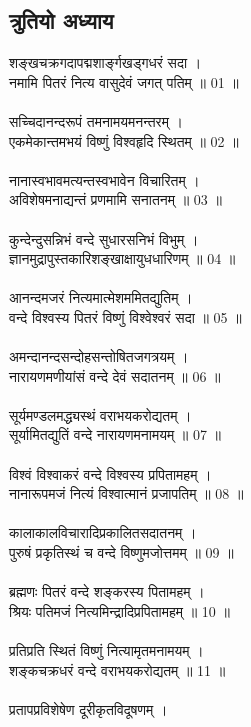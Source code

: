 \subsection{\sanskrit त्रुतियो अध्याय}
\sanskrit
शङ्खचक्रगदापद्मशार्ङ्गखड्गधरं सदा ।\\
नमामि पितरं नित्य वासुदेवं जगत् पतिम् ॥ 01 ॥\\
\\
सच्चिदानन्दरूपं तमनामयमनन्तरम् ।\\
एकमेकान्तमभयं विष्णुं विश्वहृदि स्थितम् ॥ 02 ॥\\
\\
नानास्वभावमत्यन्तस्वभावेन विचारितम् ।\\
अविशेषमनाद्यन्तं प्रणमामि सनातनम् ॥ 03 ॥\\
\\
कुन्देन्दुसन्निभं वन्दे सुधारसनिभं विभुम् ।\\
ज्ञानमुद्रापुस्तकारिशङ्खाक्षायुधधारिणम् ॥ 04 ॥\\
\\
आनन्दमजरं नित्यमात्मेशममितद्युतिम् ।\\
वन्दे विश्वस्य पितरं विष्णुं विश्वेश्वरं सदा ॥ 05 ॥\\
\\
अमन्दानन्दसन्दोहसन्तोषितजगत्रयम् ।\\
नारायणमणीयांसं वन्दे देवं सदातनम् ॥ 06 ॥\\
\\
सूर्यमण्डलमद्ध्यस्थं वराभयकरोद्यतम् ।\\
सूर्यामितद्युतिं वन्दे नारायणमनामयम् ॥ 07 ॥\\
\\
विश्वं विश्वाकरं वन्दे विश्वस्य प्रपितामहम् ।\\
नानारूपमजं नित्यं विश्वात्मानं प्रजापतिम् ॥ 08 ॥\\
\\
कालाकालविचारादिप्रकालितसदातनम् ।\\
पुरुषं प्रकृतिस्थं च वन्दे विष्णुमजोत्तमम् ॥ 09 ॥\\
\\
ब्रह्मणः पितरं वन्दे शङ्करस्य पितामहम् ।\\
श्रियः पतिमजं नित्यमिन्द्रादिप्रपितामहम् ॥ 10 ॥\\
\\
प्रतिप्रति स्थितं विष्णुं नित्यामृतमनामयम् ।\\
शङ्कचक्रधरं वन्दे वराभयकरोद्यतम् ॥ 11 ॥\\
\\
प्रतापप्रविशेषेण दूरीकृतविदूषणम् ।\\
